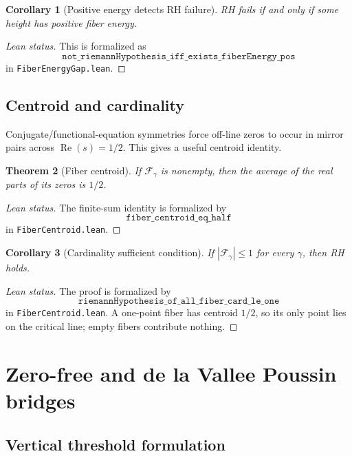 \documentclass[11pt]{amsart}
\newtheorem{theorem}{Theorem}[section]
\newtheorem{corollary}[theorem]{Corollary}
\newcommand{\re}{\operatorname{Re}}
\newcommand{\fiber}{\mathcal{F}}
\newcommand{\lean}[1]{\texttt{#1}}
\begin{document}
\begin{corollary}[Positive energy detects RH failure]
RH fails if and only if some height has positive fiber energy.
\end{corollary}

\begin{proof}[Lean status]
This is formalized as
\[
  \lean{not\_riemannHypothesis\_iff\_exists\_fiberEnergy\_pos}
\]
in \lean{FiberEnergyGap.lean}.
\end{proof}

\subsection{Centroid and cardinality}

Conjugate/functional-equation symmetries force off-line zeros to occur in
mirror pairs across \(\re(s)=1/2\).  This gives a useful centroid identity.

\begin{theorem}[Fiber centroid]
If \(\fiber_\gamma\) is nonempty, then the average of the real parts of its
zeros is \(1/2\).
\end{theorem}

\begin{proof}[Lean status]
The finite-sum identity is formalized by
\[
  \lean{fiber\_centroid\_eq\_half}
\]
in \lean{FiberCentroid.lean}.
\end{proof}

\begin{corollary}[Cardinality sufficient condition]
If \(|\fiber_\gamma|\leq 1\) for every \(\gamma\), then RH holds.
\end{corollary}

\begin{proof}[Lean status]
The proof is formalized by
\[
  \lean{riemannHypothesis\_of\_all\_fiber\_card\_le\_one}
\]
in \lean{FiberCentroid.lean}.  A one-point fiber has centroid \(1/2\), so its
only point lies on the critical line; empty fibers contribute nothing.
\end{proof}

\section{Zero-free and de la Vallee Poussin bridges}
\label{sec:zero-free}

\subsection{Vertical threshold formulation}
\end{document}
